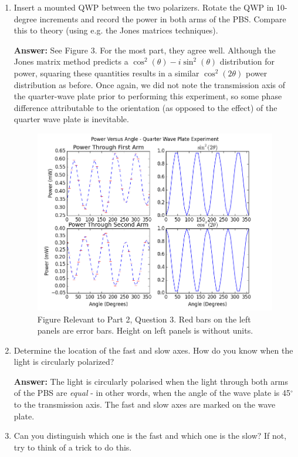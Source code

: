 \documentclass[10pt,a4paper]{article}
\begin{document}
\begin{enumerate}
\item Insert a mounted QWP between the two polarizers. Rotate the QWP in 10-degree increments and record the power in both arms of the PBS. Compare this to theory (using e.g. the Jones matrices techniques).

\textbf{Answer: } See Figure 3. For the most part, they agree well. Although the Jones matrix method predicts a $\cos^{2}(\theta) - i\sin^{2}(\theta)$ distribution for power, squaring these quantities results in a similar $\cos^{2}(2\theta)$ power distribution as before. Once again, we did not note the transmission axis of the quarter-wave plate prior to performing this experiment, so some phase difference attributable to the orientation (as opposed to the effect) of the quarter wave plate is inevitable. 
\begin{figure}[b!]
\centering
\includegraphics[scale=0.6]{../Analysis/figure_3.png}
\caption{Figure Relevant to Part 2, Question 3. Red bars on the left panels are error bars. Height on left panels is without units.} 
\end{figure}
\item Determine the location of the fast and slow axes. How do you know when the light is circularly polarized?

\textbf{Answer: } The light is circularly polarised when the light through both arms of the PBS are \textsl{equal} - in other words, when the angle of the wave plate is 45$^{\circ}$ to the transmission axis. The fast and slow axes are marked on the wave plate.

\item Can you distinguish which one is the fast and which one is the slow? If not, try to think of a trick to do this.


\end{enumerate}
\end{document}
